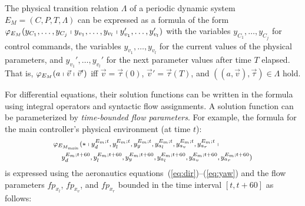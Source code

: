 \documentclass{sig-alternate}
\begin{document}
The physical transition relation $\Lambda$ 
of a periodic dynamic system
$E_M = (C, P, T, \Lambda)$
can be expressed as a formula
of the form
$\varphi_{E_M}(
y_{C_1},\ldots,y_{C_j}\shortmid
y_{v_1}, \ldots, y_{v_l}\shortmid
y_{v_1}', \ldots, y_{v_l}')
$
with
the variables $y_{C_1},\ldots,y_{C_j}$  for control commands,
the variables  $y_{v_1}, \ldots, y_{v_l}$  for the current values of the physical parameters,
and 
$y_{v_1}', \ldots, y_{v_l}'$ for the next parameter values after time $T$ elapsed.
That is,
$\varphi_{E_M}(a\shortmid \vec{v}\shortmid \vec{v}')$
iff
$\vec{v} = \vec{\tau}(0)$, 
$\vec{v}' = \vec{\tau}(T)$, and 
$((a, \vec{v}),  \vec{\tau}) \in \Lambda$ hold.

For differential equations,
their solution functions can be written in the formula 
using integral operators and syntactic flow assignments.
A solution function can be parameterized by
\emph{time-bounded flow parameters}.
%
For example, the formula for the main controller's physical environment
 (at time $t$): 
\[
\begin{medsize}
\begin{aligned}
	\begin{multlined}
	\varphi_{E_{M_\mathit{main}}}(\ast  \shortmid
		 y_d^{E_m;t},  y_l^{E_m;t}, y_y^{E_m;t}, y_{a_l}^{E_m;t}, y_{a_v}^{E_m;t}, y_{a_r}^{E_m;t}  \shortmid  \\
		 y_d^{E_m;t+60},  y_l^{E_m;t+60}, y_y^{E_m;t+60}, y_{a_l}^{E_m;t+60}, y_{a_v}^{E_m;t+60}, y_{a_r}^{E_m;t+60} )
	\end{multlined}
\end{aligned}
\end{medsize}
\]
is expressed
using the aeronautics equations~(\ref{eq:dir})--(\ref{eq:yaw})
and the flow parameters $\mathit{fp}_{x_l}$,
$\mathit{fp}_{x_v}$, and $\mathit{fp}_{x_r}$
bounded in the time interval $[t, t+60]$ as follows:
\end{document}

